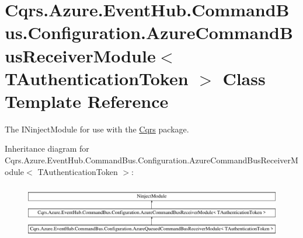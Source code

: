 \hypertarget{classCqrs_1_1Azure_1_1EventHub_1_1CommandBus_1_1Configuration_1_1AzureCommandBusReceiverModule}{}\section{Cqrs.\+Azure.\+Event\+Hub.\+Command\+Bus.\+Configuration.\+Azure\+Command\+Bus\+Receiver\+Module$<$ T\+Authentication\+Token $>$ Class Template Reference}
\label{classCqrs_1_1Azure_1_1EventHub_1_1CommandBus_1_1Configuration_1_1AzureCommandBusReceiverModule}


The I\+Ninject\+Module for use with the \hyperlink{namespaceCqrs}{Cqrs} package.  


Inheritance diagram for Cqrs.\+Azure.\+Event\+Hub.\+Command\+Bus.\+Configuration.\+Azure\+Command\+Bus\+Receiver\+Module$<$ T\+Authentication\+Token $>$\+:\begin{figure}[H]
\begin{center}
\leavevmode
\includegraphics[height=2.400000cm]{classCqrs_1_1Azure_1_1EventHub_1_1CommandBus_1_1Configuration_1_1AzureCommandBusReceiverModule}
\end{center}
\end{figure}
